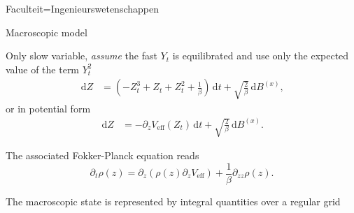 \documentclass[landscape,a1paper,fontscale=0.45]{kuleuvenposter}
\newcommand{\dd}{\,\mathrm{d}}
\newcommand\eff{\mbox{eff}}
\begin{document}
\begin{poster}{Faculteit=Ingenieurswetenschappen}
\begin{posterbox}[name=macroscopic, column=0,below=microscopic, above=bottom]{Macroscopic model}
\begin{noindentitemize}
\item Only slow variable, \emph{assume} the fast $Y_t$ is equilibrated and use only the expected value of the term $Y_t^2$
\begin{align}
\dd Z &= (-Z_t^3 + Z_t + Z_t^2 + \frac{1}{\beta}) \dd t + \sqrt{\frac{2}{\beta}} \dd B^{(x)}, \label{eq:zParisdyn}
\end{align}
or in potential form
\begin{align}
\dd Z &= -\partial_z V_{\eff} (Z_t) \dd t + \sqrt{\frac{2}{\beta}} \dd B^{(x)}. \label{eq:zParisdyn_pot}
\end{align}
%
\item The associated Fokker-Planck equation reads
\begin{equation}
\partial_t \rho(z) = \partial_z \left( \rho(z) \partial_z V_{\eff} \right) + \frac{1}{\beta} \partial_{zz} \rho(z).
\end{equation}
\item The macroscopic state is represented by integral quantities over a regular grid
\end{noindentitemize}
\end{posterbox}


\end{poster}
\end{document}
